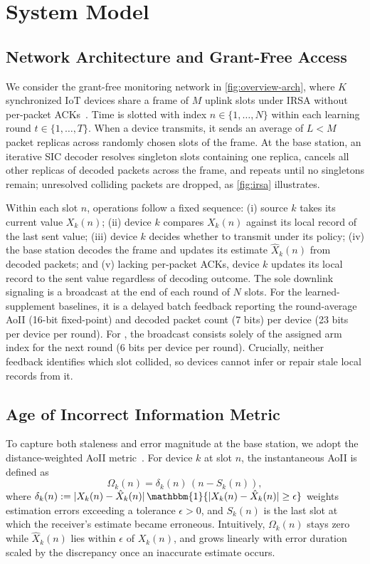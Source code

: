 \documentclass[conference]{IEEEtran}
\begin{document}
\section{System Model}
\label{sec:system}

\subsection{Network Architecture and Grant-Free Access}
\label{sec:arch}
  We consider the grant-free monitoring network in \autoref{fig:overview-arch}, where $K$ synchronized IoT devices share a frame of $M$ uplink slots under IRSA without per-packet ACKs~\cite{munari2021modern}.
  Time is slotted with index $n \in \{1, \dots, N\}$ within each learning round $t \in \{1, \dots, T\}$.
  When a device transmits, it sends an average of $L < M$ packet replicas across randomly chosen slots of the frame.
  At the base station, an iterative SIC decoder resolves singleton slots containing one replica, cancels all other replicas of decoded packets across the frame, and repeats until no singletons remain; unresolved colliding packets are dropped, as \autoref{fig:irsa} illustrates.

  Within each slot $n$, operations follow a fixed sequence:
  (i) source $k$ takes its current value $X_k(n)$;
  (ii) device $k$ compares $X_k(n)$ against its local record of the last sent value;
  (iii) device $k$ decides whether to transmit under its policy;
  (iv) the base station decodes the frame and updates its estimate $\hat{X}_k(n)$ from decoded packets; and
  (v) lacking per-packet ACKs, device $k$ updates its local record to the sent value regardless of decoding outcome.
  The sole downlink signaling is a broadcast at the end of each round of $N$ slots.
  For the learned-supplement baselines, it is a delayed batch feedback reporting the round-average AoII (16-bit fixed-point) and decoded packet count (7 bits) per device (23 bits per device per round).
  For \tool, the broadcast consists solely of the assigned arm index for the next round (6 bits per device per round).
  Crucially, neither feedback identifies which slot collided, so devices cannot infer or repair stale local records from it.

\subsection{Age of Incorrect Information Metric}
\label{sec:metric}
  To capture both staleness and error magnitude at the base station, we adopt the distance-weighted AoII metric~\cite{maatouk2022age}.
  For device $k$ at slot $n$, the instantaneous AoII is defined as
  \begin{equation}
    \Omega_k(n) = \delta_k(n)\,(n - S_k(n)),
    \label{eq:aoii}
  \end{equation}
  where $\delta_k(n) := |X_k(n) - \hat{X}_k(n)|\,\mathbbm{1}\{|X_k(n) - \hat{X}_k(n)| \ge \epsilon\}$ weights estimation errors exceeding a tolerance $\epsilon > 0$, and $S_k(n)$ is the last slot at which the receiver's estimate became erroneous.
  Intuitively, $\Omega_k(n)$ stays zero while $\hat{X}_k(n)$ lies within $\epsilon$ of $X_k(n)$, and grows linearly with error duration scaled by the discrepancy once an inaccurate estimate occurs.
\end{document}

